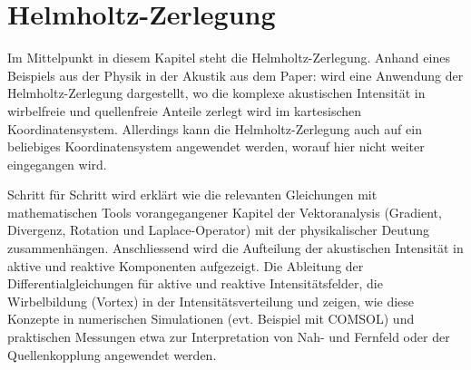 %
%
%
%
\chapter{Helmholtz-Zerlegung\label{chapter:helmholtz}}
\begin{refsection}

Im Mittelpunkt in diesem Kapitel steht die Helmholtz-Zerlegung.
Anhand eines Beispiels aus der Physik in der Akustik aus dem Paper:
\cite{helmholtz:paper}
wird eine Anwendung der Helmholtz-Zerlegung
dargestellt, wo die komplexe akustischen Intensität in wirbelfreie
und quellenfreie Anteile zerlegt wird im kartesischen Koordinatensystem.
Allerdings kann die Helmholtz-Zerlegung auch auf ein beliebiges
Koordinatensystem angewendet werden, worauf hier nicht weiter
eingegangen wird. \newline


Schritt für Schritt wird erklärt wie die relevanten Gleichungen mit mathematischen Tools vorangegangener Kapitel der Vektoranalysis (Gradient, Divergenz, Rotation und Laplace-Operator) mit der physikalischer Deutung zusammenhängen. Anschliessend wird die Aufteilung der akustischen Intensität in aktive und reaktive Komponenten aufgezeigt. Die Ableitung der Differentialgleichungen für aktive und reaktive Intensitätsfelder, die Wirbelbildung (Vortex) in der Intensitätsverteilung und zeigen, wie diese Konzepte in numerischen Simulationen (evt. Beispiel mit COMSOL) und praktischen Messungen etwa zur Interpretation von Nah- und Fernfeld oder der Quellenkopplung angewendet werden.








\printbibliography[heading=subbibliography]
\end{refsection}
